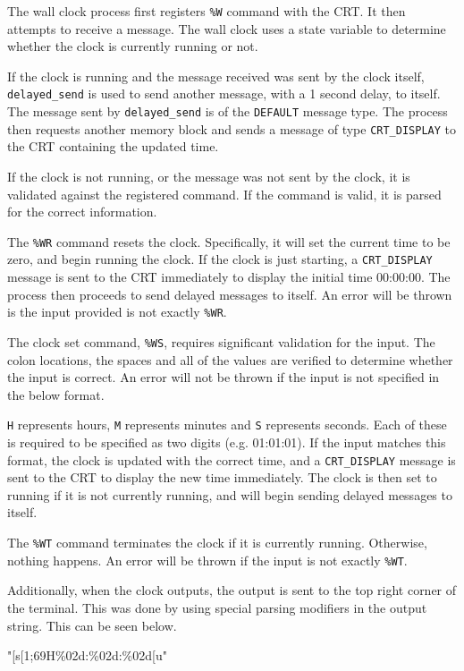 \documentclass[se]{uw-wkrpt}
\begin{document}
The wall clock process first registers \texttt{\%W} command with the CRT. It then attempts to receive a message. The wall clock uses a state variable to determine whether the clock is currently running or not.

If the clock is running and the message received was sent by the clock itself, \texttt{delayed\_send} is used to send another message, with a 1 second delay, to itself. The message sent by \texttt{delayed\_send} is of the \texttt{DEFAULT} message type. The process then requests another memory block and sends a message of type \texttt{CRT\_DISPLAY} to the CRT containing the updated time.

If the clock is not running, or the message was not sent by the clock, it is validated against the registered command. If the command is valid, it is parsed for the correct information.

The \texttt{\%WR} command resets the clock. Specifically, it will set the current time to be zero, and begin running the clock. If the clock is just starting, a \texttt{CRT\_DISPLAY} message is sent to the CRT immediately to display the initial time 00:00:00. The process then proceeds to send delayed messages to itself. An error will be thrown is the input provided is not exactly \texttt{\%WR}.

The clock set command, \texttt{\%WS},  requires significant validation for the input. The colon locations, the spaces and all of the values are verified to determine whether the input is correct. An error will not be thrown if the input is not specified in the below format.
\begin{code}
\end{code}

\texttt{H} represents hours, \texttt{M} represents minutes and \texttt{S} represents seconds. Each of these is required to be specified as two digits (e.g. 01:01:01). If the input matches this format, the clock is updated with the correct time, and a \texttt{CRT\_DISPLAY} message is sent to the CRT to display the new time immediately. The clock is then set to running if it is not currently running, and will begin sending delayed messages to itself.

The \texttt{\%WT} command terminates the clock if it is currently running. Otherwise, nothing happens. An error will be thrown if the input is not exactly \texttt{\%WT}.

Additionally, when the clock outputs, the output is sent to the top right corner of the terminal. This was done by using special parsing modifiers in the output string. This can be seen below.
\begin{code}
"[s[1;69H\%02d:\%02d:\%02d\n{}[u"
\end{code}
\end{document}
